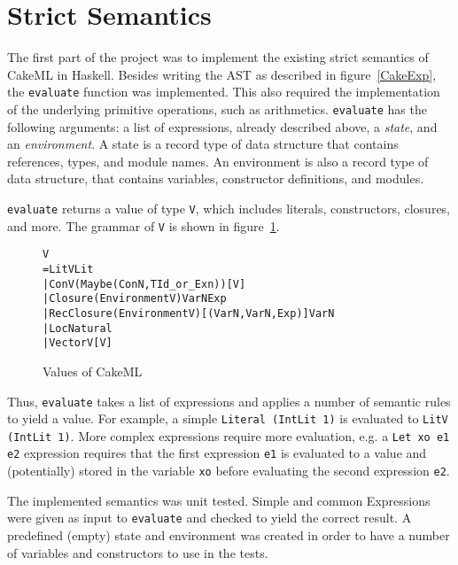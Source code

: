 
\section{Strict Semantics}
The first part of the project was to implement the existing strict semantics
of CakeML in Haskell. Besides writing the AST as described in
figure~\ref{CakeExp}, the \texttt{evaluate} function was implemented. This also
required the implementation of the underlying primitive operations, such as
arithmetics. \texttt{evaluate} has the following arguments: a list of
expressions, already described above, a \textit{state}, and an
\textit{environment}. A state is a record type of data structure that contains
references, types, and module names. An environment is also a record type of
data structure, that contains variables, constructor definitions, and modules.

\texttt{evaluate} returns a value of type \texttt{V}, which includes literals,
constructors, closures, and more. The grammar of \texttt{V}
is shown in figure~\ref{CakeV}.
\begin{figure}
\begin{alltt}
V
  = LitV Lit
  | ConV (Maybe (ConN, TId_or_Exn)) [V]
  | Closure (Environment V) VarN Exp
  | RecClosure (Environment V) [(VarN, VarN, Exp)] VarN
  | Loc Natural
  | VectorV [V]
\end{alltt}
\caption{Values of CakeML}
\label{CakeV}
\end{figure}
Thus, \texttt{evaluate} takes a list of expressions and applies a number of
semantic rules to yield a value. For example, a simple
\texttt{Literal (IntLit 1)} is evaluated to \texttt{LitV (IntLit 1)}.
More complex expressions require more evaluation, e.g. a \texttt{Let xo e1 e2}
expression requires that the first expression \texttt{e1} is evaluated to a
value and (potentially) stored in the variable \texttt{xo} before evaluating
the second expression \texttt{e2}.

The implemented semantics was unit tested. Simple and common Expressions were
given as input to \texttt{evaluate} and checked to yield the correct result.
A predefined (empty) state and environment was created in order to have a number
of variables and constructors to use in the tests. 
